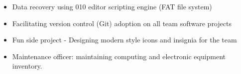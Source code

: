 \documentclass[11pt,a4paper,sans]{moderncv}        %
\begin{document}
{\begin{itemize}
  \begin{itemize}
  \item Developing statistical algorithms for extraction and interpretation of spectral features in acoustic data 
  \item Database design
  \item HMI design
  \item Interactive data visualisation
  \item Performance improvement by utilizing parallel/GPU/cluster computing with Matlab tools
  \end{itemize}
\item Data recovery using 010 editor scripting engine (FAT file system)
\item Facilitating  version control (Git) adoption on all team software projects
\item Fun side project - Designing modern style icons and insignia for the team
\item Maintenance officer: maintaining  computing and electronic equipment inventory.
\end{itemize}
}

\end{document}
